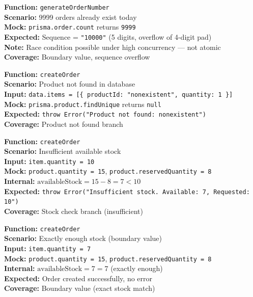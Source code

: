 \documentclass[12pt,onecolumn]{IEEEtran}
\begin{document}
\textbf{Function:} \texttt{generateOrderNumber} \\
\textbf{Scenario:} 9999 orders already exist today \\
\textbf{Mock:} \texttt{prisma.order.count} returns \texttt{9999} \\
\textbf{Expected:} Sequence = \texttt{"10000"} (5 digits, overflow of 4-digit pad) \\
\textbf{Note:} Race condition possible under high concurrency --- not atomic \\
\textbf{Coverage:} Boundary value, sequence overflow



\textbf{Function:} \texttt{createOrder} \\
\textbf{Scenario:} Product not found in database \\
\textbf{Input:} \texttt{data.items = [\{ productId: "nonexistent", quantity: 1 \}]} \\
\textbf{Mock:} \texttt{prisma.product.findUnique} returns \texttt{null} \\
\textbf{Expected:} \texttt{throw Error("Product not found: nonexistent")} \\
\textbf{Coverage:} Product not found branch



\textbf{Function:} \texttt{createOrder} \\
\textbf{Scenario:} Insufficient available stock \\
\textbf{Input:} \texttt{item.quantity = 10} \\
\textbf{Mock:} \texttt{product.quantity = 15}, \texttt{product.reservedQuantity = 8} \\
\textbf{Internal:} $\text{availableStock} = 15 - 8 = 7 < 10$ \\
\textbf{Expected:} \texttt{throw Error("Insufficient stock. Available: 7, Requested: 10")} \\
\textbf{Coverage:} Stock check branch (insufficient)



\textbf{Function:} \texttt{createOrder} \\
\textbf{Scenario:} Exactly enough stock (boundary value) \\
\textbf{Input:} \texttt{item.quantity = 7} \\
\textbf{Mock:} \texttt{product.quantity = 15}, \texttt{product.reservedQuantity = 8} \\
\textbf{Internal:} $\text{availableStock} = 7 = 7$ (exactly enough) \\
\textbf{Expected:} Order created successfully, no error \\
\textbf{Coverage:} Boundary value (exact stock match)
\end{document}
